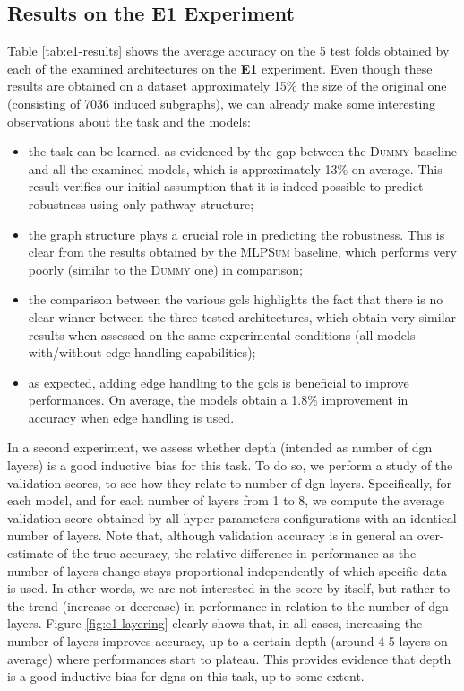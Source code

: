 \subsection{Results on the E1 Experiment}
Table \ref{tab:e1-results} shows the average accuracy on the 5 test folds obtained by each of the examined architectures on the \textbf{E1} experiment. Even though these results are obtained on a dataset approximately 15\% the size of the original one (consisting of 7036 induced subgraphs), we can already make some interesting observations about the task and the models:
\begin{itemize}
    \item the task can be learned, as evidenced by the gap between the \textsc{Dummy} baseline and all the examined models, which is approximately 13\% on average. This result verifies our initial assumption that it is indeed possible to predict robustness using only pathway structure;
    \item the graph structure plays a crucial role in predicting the robustness. This is clear from the results obtained by the \textsc{MLPSum} baseline, which performs very poorly (similar to the \textsc{Dummy} one) in comparison;
    \item the comparison between the various \glspl{gcl} highlights the fact that there is no clear winner between the three tested architectures, which obtain very similar results when assessed on the same experimental conditions (\ie all models with/without edge handling capabilities);
    \item as expected, adding edge handling to the \glspl{gcl} is beneficial to improve performances. On average, the models obtain a 1.8\% improvement in accuracy when edge handling is used.
\end{itemize}



In a second experiment, we assess whether depth (intended as number of \gls{dgn} layers) is a good inductive bias for this task. To do so, we perform a \posthoc study of the validation scores, to see how they relate to number of \gls{dgn} layers. Specifically, for each model, and for each number of layers from 1 to 8, we compute the average validation score obtained by all hyper-parameters configurations with an identical number of layers. Note that, although validation accuracy is in general an over-estimate of the true accuracy, the relative difference in performance as the number of layers change stays proportional independently of which specific data is used. In other words, we are not interested in the score by itself, but rather to the trend (increase or decrease) in performance in relation to the number of \gls{dgn} layers. Figure \ref{fig:e1-layering} clearly shows that, in all cases, increasing the number of layers improves accuracy, up to a certain depth (around 4-5 layers on average) where performances start to plateau. This provides evidence that depth is a good inductive bias for \glspl{dgn} on this task, up to some extent.


